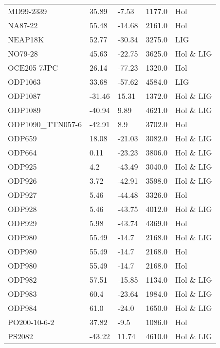 \begin{longtable}{lllrl}
        MD99-2339 &    35.89 &     -7.53 &     1177.0 &         Hol \\
          NA87-22 &    55.48 &    -14.68 &     2161.0 &         Hol \\
          NEAP18K &    52.77 &    -30.34 &     3275.0 &         LIG \\
          NO79-28 &    45.63 &    -22.75 &     3625.0 &   Hol \& LIG \\
      OCE205-7JPC &    26.14 &    -77.23 &     1320.0 &         Hol \\
          ODP1063 &    33.68 &    -57.62 &     4584.0 &         LIG \\
          ODP1087 &   -31.46 &     15.31 &     1372.0 &   Hol \& LIG \\
          ODP1089 &   -40.94 &      9.89 &     4621.0 &   Hol \& LIG \\
 ODP1090\_TTN057-6 &   -42.91 &       8.9 &     3702.0 &         Hol \\
           ODP659 &    18.08 &    -21.03 &     3082.0 &   Hol \& LIG \\
           ODP664 &     0.11 &    -23.23 &     3806.0 &   Hol \& LIG \\
           ODP925 &      4.2 &    -43.49 &     3040.0 &   Hol \& LIG \\
           ODP926 &     3.72 &    -42.91 &     3598.0 &   Hol \& LIG \\
           ODP927 &     5.46 &    -44.48 &     3326.0 &         Hol \\
           ODP928 &     5.46 &    -43.75 &     4012.0 &   Hol \& LIG \\
           ODP929 &     5.98 &    -43.74 &     4369.0 &         Hol \\
           ODP980 &    55.49 &     -14.7 &     2168.0 &   Hol \& LIG \\
           ODP980 &    55.49 &     -14.7 &     2168.0 &         Hol \\
           ODP980 &    55.49 &     -14.7 &     2168.0 &         Hol \\
           ODP982 &    57.51 &    -15.85 &     1134.0 &   Hol \& LIG \\
           ODP983 &     60.4 &    -23.64 &     1984.0 &   Hol \& LIG \\
           ODP984 &     61.0 &     -24.0 &     1650.0 &   Hol \& LIG \\
     PO200-10-6-2 &    37.82 &      -9.5 &     1086.0 &         Hol \\
           PS2082 &   -43.22 &     11.74 &     4610.0 &   Hol \& LIG \\

\end{longtable}

